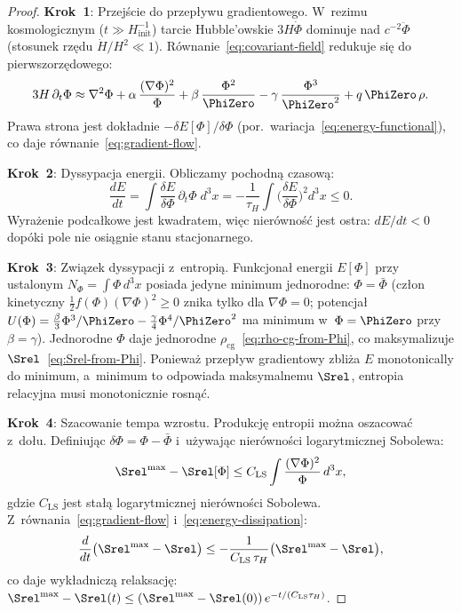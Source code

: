 \begin{proof}
\textbf{Krok~1}: Przej\'scie do przep\l{}ywu gradientowego.
W~rezimu kosmologicznym ($t \gg H^{-1}_{\mathrm{init}}$)
tarcie Hubble'owskie $3H\dot\Phi$ dominuje nad
$c^{-2}\ddot\Phi$ (stosunek rz\k{e}du $\dot H/H^2 \ll 1$).
R\'ownanie~\eqref{eq:covariant-field} redukuje si\k{e} do
pierwszorz\k{e}dowego:
\begin{equation}
    3H\,\partial_t\Phi
    \approx \nabla^2\Phi
    + \alpha\,\frac{(\nabla\Phi)^2}{\Phi}
    + \beta\,\frac{\Phi^2}{\PhiZero}
    - \gamma\,\frac{\Phi^3}{\PhiZero^2}
    + q\,\PhiZero\,\rho.
\end{equation}
Prawa strona jest dok\l{}adnie $-\delta E[\Phi]/\delta\Phi$
(por.~wariacja~\eqref{eq:energy-functional}), co daje
r\'ownanie~\eqref{eq:gradient-flow}.

\medskip\noindent
\textbf{Krok~2}: Dyssypacja energii.
Obliczamy pochodn\k{a} czasow\k{a}:
\[
    \frac{dE}{dt}
    = \int \frac{\delta E}{\delta\Phi}\,\partial_t\Phi\;d^3x
    = -\frac{1}{\tau_H}
      \int \!\biggl(\frac{\delta E}{\delta\Phi}\biggr)^{\!2} d^3x
    \leq 0.
\]
Wyra\.zenie podca\l{}kowe jest kwadratem, wi\k{e}c
nierówno\'s\'c jest ostra: $dE/dt < 0$ dop\'oki pole
nie osi\k{a}gnie stanu stacjonarnego.

\medskip\noindent
\textbf{Krok~3}: Zwi\k{a}zek dyssypacji z~entropi\k{a}.
Funkcjona\l{} energii $E[\Phi]$ przy ustalonym
$N_\Phi = \int\Phi\,d^3x$ posiada jedyne minimum
jednorodne: $\Phi = \bar\Phi$ (cz\l{}on kinetyczny
$\frac{1}{2}f(\Phi)(\nabla\Phi)^2 \geq 0$ znika
tylko dla $\nabla\Phi = 0$; potencja\l{} $U(\Phi)
= \frac{\beta}{3}\Phi^3/\PhiZero - \frac{\gamma}{4}\Phi^4/\PhiZero^2$
ma minimum w~$\Phi = \PhiZero$ przy $\beta = \gamma$).
Jednorodne $\Phi$ daje jednorodne
$\rho_{\mathrm{cg}}$~\eqref{eq:rho-cg-from-Phi},
co maksymalizuje $\Srel$~\eqref{eq:Srel-from-Phi}.
Poniewa\.z przep\l{}yw gradientowy zbli\.za $E$
monotonically do minimum, a~minimum to odpowiada
maksymalnemu $\Srel$, entropia relacyjna musi
monotonicznie rosn\k{a}\'c.

\medskip\noindent
\textbf{Krok~4}: Szacowanie tempa wzrostu.
Produkcj\k{e} entropii mo\.zna oszacowa\'c z~do\l{}u.
Definiuj\k{a}c $\delta\Phi = \Phi - \bar\Phi$ i~u\.zywaj\k{a}c
nier\'owno\'sci logarytmicznej Sobolewa:
\begin{equation}\label{eq:log-sobolev-bound}
    \Srel^{\max} - \Srel[\Phi]
    \leq C_{\mathrm{LS}}\int
      \frac{(\nabla\Phi)^2}{\Phi}\,d^3x,
\end{equation}
gdzie $C_{\mathrm{LS}}$ jest sta\l{}\k{a} logarytmicznej
nier\'owno\'sci Sobolewa. Z~r\'ownania~\eqref{eq:gradient-flow}
i~\eqref{eq:energy-dissipation}:
\begin{equation}
    \frac{d}{dt}\bigl(\Srel^{\max} - \Srel\bigr)
    \leq -\frac{1}{C_{\mathrm{LS}}\,\tau_H}
      \bigl(\Srel^{\max} - \Srel\bigr),
\end{equation}
co daje wyk\l{}adnicz\k{a} relaksacj\k{e}:
$\Srel^{\max} - \Srel(t) \leq
(\Srel^{\max} - \Srel(0))\,e^{-t/(C_{\mathrm{LS}}\tau_H)}$.
\end{proof}

